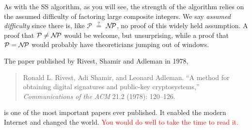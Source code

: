 \def\NNP{\mathcal{N\kern -2ptP}}

As with the SS algorithm, as you will see, the strength of the
algorithm relies on the assumed difficulty of factoring large composite
integers. We say \emph{assumed difficulty} since there is, like
$\mathcal{P}$ {\lower 1.5pt\hbox{$\overset{?}{=}$}} $\NNP$, no proof of this widely held
assumption. A proof that $\mathcal{P} \ne \NNP$ would be
welcome, but unsurprising, while a proof that $\mathcal{P} =
\NNP$ would probably have theoreticians jumping out of windows.

The paper published by Rivest, Shamir and Adleman in 1978,
\begin{quote}
  Ronald L. Rivest, Adi Shamir, and Leonard Adleman. ``A method for
  obtaining digital signatures and public-key cryptosystems,''
  \emph{Communications of the ACM} 21.2 (1978): 120--126.
\end{quote}
is one of the most important papers ever published. It enabled the
modern Internet and changed the world. \textcolor{red}{You would do well
to take the time to read it.}
